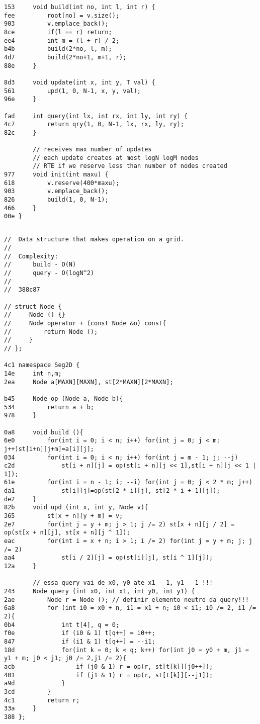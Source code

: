 \documentclass[11pt, a4paper, twoside]{article}
\begin{document}
\begin{lstlisting}
153 	void build(int no, int l, int r) {
fee 		root[no] = v.size();
903 		v.emplace_back();
8ce 		if(l == r) return;
ee4 		int m = (l + r) / 2;
b4b 		build(2*no, l, m);
4d7 		build(2*no+1, m+1, r);
88e 	}
    
8d3 	void update(int x, int y, T val) {
561 		upd(1, 0, N-1, x, y, val);
96e 	}
    
fad 	int query(int lx, int rx, int ly, int ry) {
4c7 		return qry(1, 0, N-1, lx, rx, ly, ry);
82c 	}
    
    	// receives max number of updates
    	// each update creates at most logN logM nodes
    	// RTE if we reserve less than number of nodes created
977 	void init(int maxu) {
618 		v.reserve(400*maxu);
903 		v.emplace_back();
826 		build(1, 0, N-1);
466 	}
00e }
\end{lstlisting}

\subsection{ }
\begin{lstlisting}
//  Data structure that makes operation on a grid.
//
//  Complexity:
//      build - O(N)
//      query - O(logN^2)
//  
//  388c87

// struct Node {
//     Node () {}
//     Node operator + (const Node &o) const{
//         return Node ();
//     }
// };

4c1 namespace Seg2D {
14e     int n,m;
2ea     Node a[MAXN][MAXN], st[2*MAXN][2*MAXN];
    
b45     Node op (Node a, Node b){
534         return a + b;
978     }
    
0a8     void build (){
6e0         for(int i = 0; i < n; i++) for(int j = 0; j < m; j++)st[i+n][j+m]=a[i][j];
034         for(int i = 0; i < n; i++) for(int j = m - 1; j; --j)
c2d             st[i + n][j] = op(st[i + n][j << 1],st[i + n][j << 1 | 1]);
61e         for(int i = n - 1; i; --i) for(int j = 0; j < 2 * m; j++)
da1             st[i][j]=op(st[2 * i][j], st[2 * i + 1][j]);
de2     }
82b     void upd (int x, int y, Node v){
365         st[x + n][y + m] = v;
2e7         for(int j = y + m; j > 1; j /= 2) st[x + n][j / 2] = op(st[x + n][j], st[x + n][j ^ 1]);
eac         for(int i = x + n; i > 1; i /= 2) for(int j = y + m; j; j /= 2)
aa4             st[i / 2][j] = op(st[i][j], st[i ^ 1][j]);
12a     }
    
        // essa query vai de x0, y0 ate x1 - 1, y1 - 1 !!!
243     Node query (int x0, int x1, int y0, int y1) {
2ae         Node r = Node (); // definir elemento neutro da query!!!
6a8         for (int i0 = x0 + n, i1 = x1 + n; i0 < i1; i0 /= 2, i1 /= 2){
0b4             int t[4], q = 0;
f0e             if (i0 & 1) t[q++] = i0++;
847             if (i1 & 1) t[q++] = --i1;
18d             for(int k = 0; k < q; k++) for(int j0 = y0 + m, j1 = y1 + m; j0 < j1; j0 /= 2,j1 /= 2){
acb                 if (j0 & 1) r = op(r, st[t[k]][j0++]);
401                 if (j1 & 1) r = op(r, st[t[k]][--j1]);
a9d             }
3cd         }
4c1         return r;
33a     }
388 };
\end{lstlisting}
\end{document}
